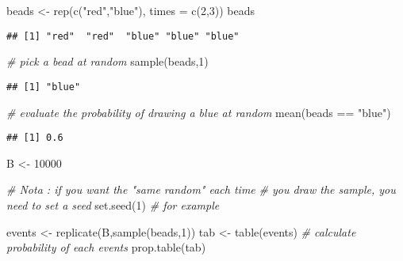 \documentclass[
]{book}
\newenvironment{Shaded}{\begin{snugshade}}{\end{snugshade}}
\newcommand{\AttributeTok}[1]{\textcolor[rgb]{0.77,0.63,0.00}{#1}}
\newcommand{\CommentTok}[1]{\textcolor[rgb]{0.56,0.35,0.01}{\textit{#1}}}
\newcommand{\DecValTok}[1]{\textcolor[rgb]{0.00,0.00,0.81}{#1}}
\newcommand{\FunctionTok}[1]{\textcolor[rgb]{0.00,0.00,0.00}{#1}}
\newcommand{\NormalTok}[1]{#1}
\newcommand{\OtherTok}[1]{\textcolor[rgb]{0.56,0.35,0.01}{#1}}
\newcommand{\SpecialCharTok}[1]{\textcolor[rgb]{0.00,0.00,0.00}{#1}}
\newcommand{\StringTok}[1]{\textcolor[rgb]{0.31,0.60,0.02}{#1}}
\begin{document}
\begin{Shaded}
\begin{Highlighting}[]
\NormalTok{beads }\OtherTok{\textless{}{-}} \FunctionTok{rep}\NormalTok{(}\FunctionTok{c}\NormalTok{(}\StringTok{"red"}\NormalTok{,}\StringTok{"blue"}\NormalTok{), }\AttributeTok{times =} \FunctionTok{c}\NormalTok{(}\DecValTok{2}\NormalTok{,}\DecValTok{3}\NormalTok{))}
\NormalTok{beads}
\end{Highlighting}
\end{Shaded}

\begin{verbatim}
## [1] "red"  "red"  "blue" "blue" "blue"
\end{verbatim}

\begin{Shaded}
\begin{Highlighting}[]
\CommentTok{\# pick a bead at random}
\FunctionTok{sample}\NormalTok{(beads,}\DecValTok{1}\NormalTok{)}
\end{Highlighting}
\end{Shaded}

\begin{verbatim}
## [1] "blue"
\end{verbatim}

\begin{Shaded}
\begin{Highlighting}[]
\CommentTok{\# evaluate the probability of drawing a blue at random}
\FunctionTok{mean}\NormalTok{(beads }\SpecialCharTok{==} \StringTok{"blue"}\NormalTok{)}
\end{Highlighting}
\end{Shaded}

\begin{verbatim}
## [1] 0.6
\end{verbatim}

\begin{Shaded}
\begin{Highlighting}[]
\NormalTok{B }\OtherTok{\textless{}{-}} \DecValTok{10000}

\CommentTok{\# Nota : if you want the "same random" each time }
\CommentTok{\# you draw the sample, you need to set a seed}
\FunctionTok{set.seed}\NormalTok{(}\DecValTok{1}\NormalTok{)}
\CommentTok{\# for example}



\NormalTok{events }\OtherTok{\textless{}{-}} \FunctionTok{replicate}\NormalTok{(B,}\FunctionTok{sample}\NormalTok{(beads,}\DecValTok{1}\NormalTok{))}
\NormalTok{tab }\OtherTok{\textless{}{-}} \FunctionTok{table}\NormalTok{(events)}
\CommentTok{\# calculate probability of each events}
\FunctionTok{prop.table}\NormalTok{(tab)}
\end{Highlighting}
\end{Shaded}
\end{document}
